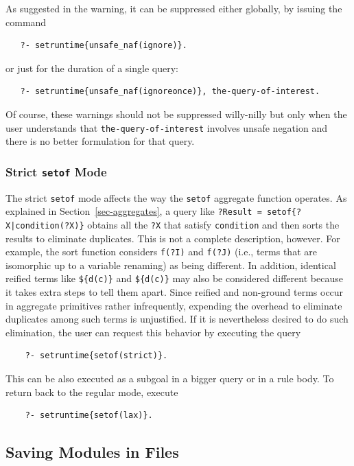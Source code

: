 \documentclass[11pt]{article}
\begin{document}
As suggested in the warning, it can be suppressed either globally, by
issuing the command
\begin{verbatim}
   ?- setruntime{unsafe_naf(ignore)}.
\end{verbatim}
or just for the duration of a single query:
\begin{verbatim}
   ?- setruntime{unsafe_naf(ignoreonce)}, the-query-of-interest.
\end{verbatim}
Of course, these warnings should not be suppressed willy-nilly but only
when the user understands that \texttt{the-query-of-interest} involves
unsafe negation and there is no better formulation for that query. 

\subsubsection{Strict \texttt{setof} Mode} \label{sec-strict-setof}

The strict \texttt{setof} mode affects the way the \texttt{setof} aggregate
function operates.  
As explained in Section~\ref{sec-aggregates},
a query like \texttt{?Result = setof\{?X|condition(?X)\}} obtains all the
\texttt{?X} that satisfy \texttt{condition} and then sorts the results to
eliminate duplicates. This is not a complete description, however.
For example, the sort function considers \texttt{f(?I)} and \texttt{f(?J)}
(i.e., terms that are isomorphic up to a variable renaming) as being
different. In addition, identical reified terms like \texttt{\$\{d(c)\}} and
\texttt{\$\{d(c)\}} may also be considered different because it takes  extra
steps to tell them apart. Since reified and non-ground
terms occur in aggregate primitives
rather infrequently, expending the overhead to eliminate duplicates among
such terms is unjustified. If it is nevertheless desired to do such
elimination, the user can request this behavior by executing the query
\begin{verbatim}
    ?- setruntime{setof(strict)}.
\end{verbatim}
This can be also executed as a subgoal in a bigger query or in a rule body.
To return back to the regular mode, execute
\begin{verbatim}
    ?- setruntime{setof(lax)}.
\end{verbatim}


\subsection{Saving Modules in Files}
\end{document}

